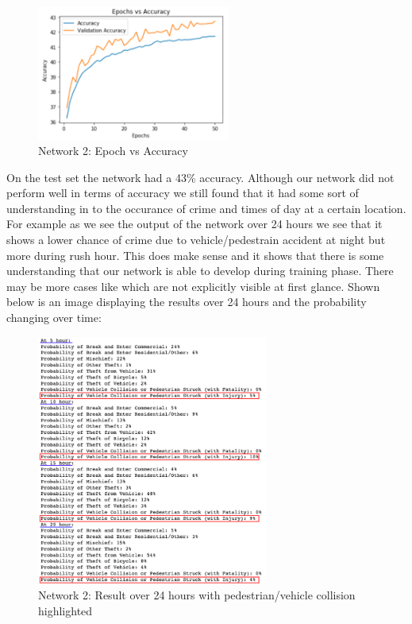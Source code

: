\documentclass[conference]{IEEEtran}
\begin{document}
\begin{figure}[H]
  \centering
  \captionsetup{justification=centering}
  \centering
  \includegraphics[width=2.5in]{13.png}
  \caption{Network 2: Epoch vs Accuracy}  
  \label{1}
\end{figure}

On the test set the network had a 43\% accuracy. Although our network did not perform well in terms of accuracy we still found
that it had some sort of understanding in to the occurance of crime and times of day at a certain location. For example as we
see the output of the network over 24 hours we see that it shows a lower chance of crime due to vehicle/pedestrain accident at night
but more during rush hour. This does make sense and it shows that there is some understanding that our network is able to develop
during training phase. There may be more cases like which are not explicitly visible at first glance. Shown below is an image displaying
the results over 24 hours and the probability changing over time:

\begin{figure}[H]
  \centering
  \captionsetup{justification=centering}
  \centering
  \includegraphics[width=3in]{14.png}
  \caption{Network 2: Result over 24 hours with pedestrian/vehicle collision highlighted}  
  \label{1}
\end{figure}
\end{document}
